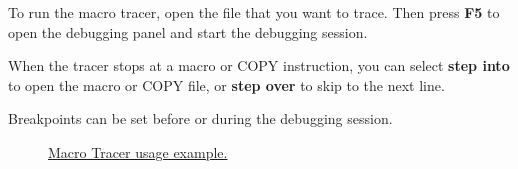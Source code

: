 To run the macro tracer, open the file that you want to trace. Then press \textbf{F5} to open the debugging panel and start the debugging session.

When the tracer stops at a macro or COPY instruction, you can select \textbf{step into} to open the macro or COPY file, or \textbf{step over} to skip to the next line.

Breakpoints can be set before or during the debugging session.

\begin{figure}[H]
	\centering
	\caption{\href{https://github.com/eclipse/che-che4z-lsp-for-hlasm/blob/master/readme\_res/tracer.gif}{Macro Tracer usage example.}}
\end{figure}